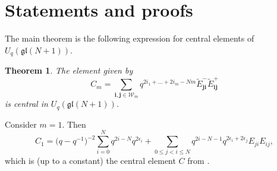 \documentclass[pdftex]{sigma}
\numberwithin{equation}{section}
\newtheorem{Theorem}{Theorem}[section]
\newcommand{\Uqgl}{{U_q(\mathfrak{gl}(N+1))}}
\newcommand{\ii}{{\mathbf{i}}}
\newcommand{\jj}{{\mathbf{j}}}
\begin{document}
\section{Statements and proofs}

The main theorem is the following expression for central elements of $\Uqgl$.
\begin{Theorem}\label{Main}
	The element given by
\begin{equation*}
C_m=\sum_{\ii,\jj \in \mathcal{W}_m} q^{ 2i_1 + \dots + 2i_m-Nm} \tilde{E}_{\jj \ii}^-\tilde{E}_{\ii\jj}^+
\end{equation*}
is central in $ \Uqgl $.
\end{Theorem}

\begin{Example}
Consider $m=1$. Then
\[
C_1 = \big(q-q^{-1}\big)^{-2}\sum_{i=0}^N q^{2i-N} q^{2\epsilon_i} + \sum_{0\leq j<i \leq N} q^{2i-N-1} q^{2\epsilon_i+2\epsilon_j}E_{ji}E_{ij},
\]
which is (up to a constant) the central element $C$ from \cite{GZB}.
\end{Example}
\end{document}
